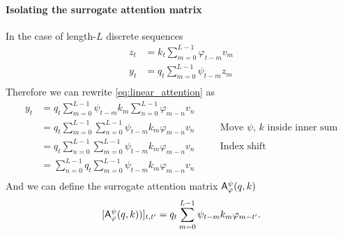 \paragraph{Isolating the surrogate attention matrix}
%
In the case of length-$L$ discrete sequences%
%
\begin{equation}\label{eq:linear_attention_convolution3}
    \begin{aligned}
        z_t &= k_t \sum_{m=0}^{L-1} \varphi_{t-m} v_m \\
        y_t &= q_t \sum_{m=0}^{L-1} \psi_{t-m} z_m\\
    \end{aligned}
\end{equation}
%
Therefore we can rewrite \eqref{eq:linear_attention} as
%
\begin{equation}
    \begin{aligned}
        y_t &= q_t \sum_{m=0}^{L-1} \psi_{t-m} k_m \sum_{n=0}^{L-1} \varphi_{m-n} v_n\\
             &= q_t \sum_{m=0}^{L-1} \sum_{n=0}^{L-1} \psi_{t-m} k_m \varphi_{m-n} v_n &&\quad\text{Move $\psi$, $k$ inside inner sum}\\
             &= q_t \sum_{n=0}^{L-1} \sum_{m=0}^{L-1} \psi_{t-m} k_m \varphi_{m-n} v_n &&\quad\text{Index shift}\\
             &= \sum_{n=0}^{L-1} q_t \sum_{m=0}^{L-1} \psi_{t-m} k_{m} \varphi_{m-n} v_{n}\\
    \end{aligned}
\end{equation}
%
And we can define the surrogate attention matrix $\mathsf{A}_\varphi^\psi(q,k)$
%
\begin{equation}\label{eq:linear_attention_matrix2}
    \begin{aligned}
        [\sA_\varphi^\psi(q,k))]_{t,t'} &= q_t \sum_{m=0}^{L-1} \psi_{t-m} k_{m} \varphi_{m - t'}. \\
    \end{aligned}
\end{equation}
%
